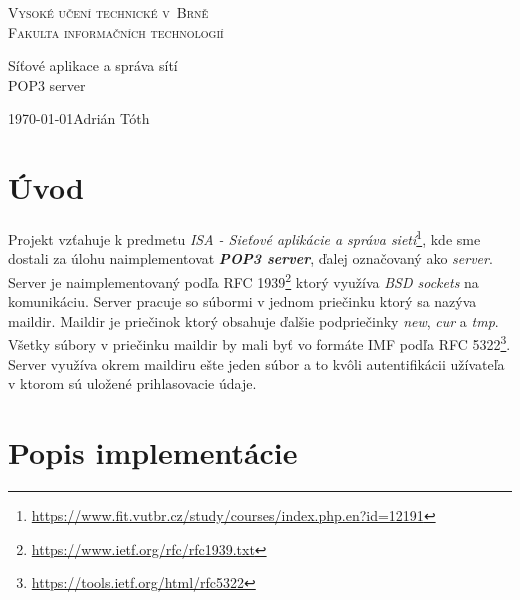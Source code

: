 \documentclass[11pt,a4paper]{article}
\begin{document}

\begin{titlepage}

\begin{center}

	\thispagestyle{empty}

	\textsc {
		\Huge Vysoké učení technické v~Brně\\[0.4em]
		\huge Fakulta informačních technologií
	}\\


	{
		\LARGE Síťové aplikace a správa sítí\\[0.4em]
		\Huge POP3 server
	}


\end{center}

	{
		\LARGE \today \hfill Adrián Tóth
	}

\end{titlepage}	

\setlength{\parskip}{0pt}
{\hypersetup{hidelinks}\tableofcontents}
\setlength{\parskip}{0pt}

\newpage %

\section{Úvod}
Projekt vzťahuje k predmetu \textit{ISA - Sieťové aplikácie a správa sietí}\footnote{\url{https://www.fit.vutbr.cz/study/courses/index.php.en?id=12191}}, kde sme dostali za úlohu naimplementovat \textbf{\textit{POP3 server}}, ďalej označovaný ako \textit{server}. Server je naimplementovaný podľa RFC 1939\footnote{\url{https://www.ietf.org/rfc/rfc1939.txt}} ktorý využíva \textit{BSD sockets} na komunikáciu. Server pracuje so súbormi v jednom priečinku ktorý sa nazýva maildir. Maildir je priečinok ktorý obsahuje ďalšie podpriečinky \textit{new}, \textit{cur} a \textit{tmp}. Všetky súbory v priečinku maildir by mali byť vo formáte IMF podľa RFC 5322\footnote{\url{https://tools.ietf.org/html/rfc5322}}. Server využíva okrem maildiru ešte jeden súbor a to kvôli autentifikácii užívateľa v ktorom sú uložené prihlasovacie údaje.

\section{Popis implementácie}
\end{document}
